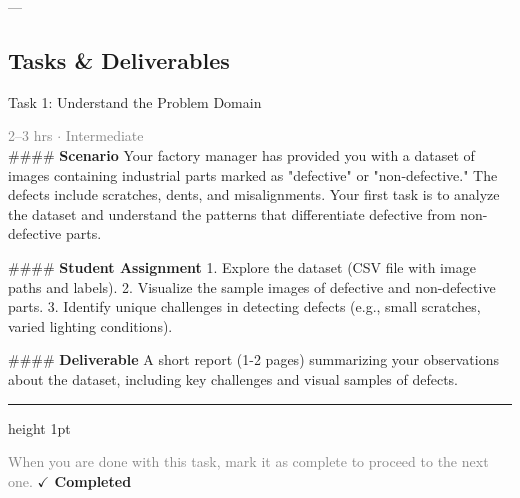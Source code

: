 \documentclass[10pt,a4paper]{article}
\begin{document}
---

\subsection*{Tasks \& Deliverables}

\begin{taskbox}{Task 1: Understand the Problem Domain}

    {\small \textcolor{gray}{2--3 hrs $\cdot$ Intermediate}}\\[12pt]

    \#\#\#\# \textbf{Scenario}  
Your factory manager has provided you with a dataset of images containing industrial parts marked as "defective" or "non-defective." The defects include scratches, dents, and misalignments. Your first task is to analyze the dataset and understand the patterns that differentiate defective from non-defective parts.  

\#\#\#\# \textbf{Student Assignment}  
1. Explore the dataset (CSV file with image paths and labels).  
2. Visualize the sample images of defective and non-defective parts.  
3. Identify unique challenges in detecting defects (e.g., small scratches, varied lighting conditions).  

\#\#\#\# \textbf{Deliverable}  
A short report (1-2 pages) summarizing your observations about the dataset, including key challenges and visual samples of defects.\par

    \vspace{16pt}

    \textcolor{cardBorder}{\hrule height 1pt}\vspace{8pt}

    \small \textcolor{gray}{When you are done with this task, mark it as complete to proceed to the next one.} \hfill \textbf{\textcolor{brandDark}{$\checkmark$ Completed}}

\end{taskbox}
\end{document}
